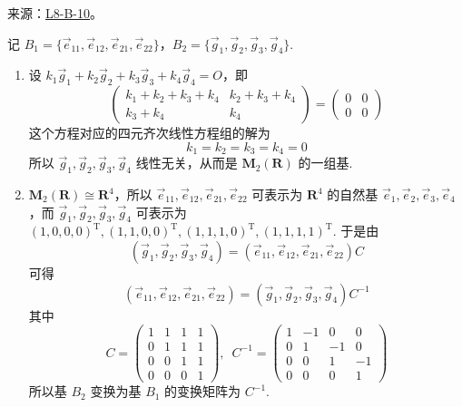 \documentclass[UTF8,12pt,a4paper,fontset=fandol]{ctexart}
\begin{document}
\noindent 来源：\href{https://github.com/yhwu-is/Linear-Algebra-Left-Undone/blob/new/%E8%AE%B2%E4%B9%89/%E4%B8%93%E9%A2%98/8%20%E7%9B%B8%E6%8A%B5%E6%A0%87%E5%87%86%E5%BD%A2.tex}{L8-B-10}。
\begin{solve}
记 $ B_1 = \{\vec{e}_{11}, \vec{e}_{12}, \vec{e}_{21}, \vec{e}_{22}\} $，$ B_2 = \{\vec{g}_1, \vec{g}_2, \vec{g}_3, \vec{g}_4\} $.
            \begin{enumerate}
                \item 设 $ k_1 \vec{g}_1 + k_2 \vec{g}_2 + k_3 \vec{g}_3 + k_4 \vec{g}_4 = O $，即
                      \[ \begin{pmatrix} k_1 + k_2 + k_3 + k_4 & k_2 + k_3 + k_4 \\ k_3 + k_4 & k_4 \end{pmatrix} = \begin{pmatrix} 0 & 0 \\ 0 & 0 \end{pmatrix} \]
                      这个方程对应的四元齐次线性方程组的解为
                      \[ k_1 = k_2 = k_3 = k_4 = 0 \]
                      所以 $ \vec{g}_1, \vec{g}_2, \vec{g}_3, \vec{g}_4 $ 线性无关，从而是 $ \mathbf{M}_2(\mathbf{R}) $ 的一组基.

                \item \label{item:11:B:4:2}
                      $ \mathbf{M}_2(\mathbf{R}) \cong \mathbf{R}^4 $，所以 $ \vec{e}_{11}, \vec{e}_{12}, \vec{e}_{21}, \vec{e}_{22} $ 可表示为 $ \mathbf{R}^4 $ 的自然基 $ \vec{e}_1, \vec{e}_2, \vec{e}_3, \vec{e}_4 $，而 $ \vec{g}_1, \vec{g}_2, \vec{g}_3, \vec{g}_4 $ 可表示为 $ (1, 0, 0, 0)^{\mathrm{T}},\allowbreak (1, 1, 0, 0)^{\mathrm{T}},\allowbreak (1, 1, 1, 0)^{\mathrm{T}},\allowbreak (1, 1, 1, 1)^{\mathrm{T}} $. 于是由
                      \[ (\vec{g}_1, \vec{g}_2, \vec{g}_3, \vec{g}_4) = (\vec{e}_{11}, \vec{e}_{12}, \vec{e}_{21}, \vec{e}_{22}) C \]
                      可得
                      \[ (\vec{e}_{11}, \vec{e}_{12}, \vec{e}_{21}, \vec{e}_{22}) = (\vec{g}_1, \vec{g}_2, \vec{g}_3, \vec{g}_4) C^{-1} \]
                      其中
                      \[ C = \begin{pmatrix}
                              1 & 1 & 1 & 1 \\
                              0 & 1 & 1 & 1 \\
                              0 & 0 & 1 & 1 \\
                              0 & 0 & 0 & 1
                          \end{pmatrix},\enspace C^{-1} = \begin{pmatrix}
                              1 & -1 & 0  & 0  \\
                              0 & 1  & -1 & 0  \\
                              0 & 0  & 1  & -1 \\
                              0 & 0  & 0  & 1
                          \end{pmatrix} \]
                      所以基 $ B_2 $ 变换为基 $ B_1 $ 的变换矩阵为 $ C^{-1} $.


\end{enumerate}
\end{solve}
\end{document}
